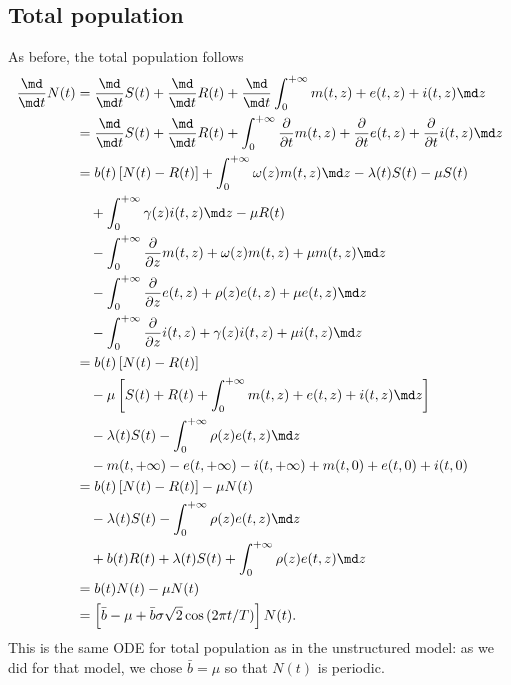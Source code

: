 \documentclass{jpmarticle}
\begin{document}
\subsection{Total population}

As before, the total population follows
\begin{equation}
  \begin{split}
    \frac{\md}{\md t} N(t)
    &= \frac{\md}{\md t} S(t)
    + \frac{\md}{\md t} R(t)
    + \frac{\md}{\md t} \int_0^{+\infty} m(t, z) + e(t, z) + i(t, z) \md z
    \\
    &= \frac{\md}{\md t} S(t)
    + \frac{\md}{\md t} R(t)
    + \int_0^{+\infty} \frac{\partial}{\partial t} m(t, z)
    + \frac{\partial}{\partial t} e(t, z)
    + \frac{\partial}{\partial t} i(t, z) \md z
    \\
    &=
    b(t) \left[N(t) - R(t)\right]
    + \int_0^{+\infty} \omega(z) m(t, z) \md z
    - \lambda(t) S(t) - \mu S(t)
    \\ & \quad {}
    + \int_0^{+\infty} \gamma(z) i(t, z) \md z
    - \mu R(t)
    \\ & \quad {}
    - \int_0^{+\infty}
    \frac{\partial}{\partial z} m(t, z)
    + \omega(z) m(t, z)
    + \mu m(t, z)
    \md z
    \\ & \quad {}
    - \int_0^{+\infty}
    \frac{\partial}{\partial z} e(t, z)
    + \rho(z) e(t, z)
    + \mu e(t, z)
    \md z
    \\ & \quad {}
    - \int_0^{+\infty}
    \frac{\partial}{\partial z} i(t, z)
    + \gamma(z) i(t, z)
    + \mu i(t, z)
    \md z
    \\
    &=
    b(t) \left[N(t) - R(t)\right]
    \\ & \quad {}
    - \mu \left[
      S(t) + R(t)
      + \int_0^{+\infty}
      m(t, z) + e(t, z) + i(t, z)
      \md z
    \right]
    \\ & \quad {}
    - \lambda(t) S(t)
    - \int_0^{+\infty}
    \rho(z) e(t, z)
    \md z
    \\ & \quad {}
    - m(t, +\infty) - e(t, +\infty) - i(t, +\infty)
    + m(t, 0) + e(t, 0) + i(t, 0)
    \\
    &=
    b(t) \left[N(t) - R(t)\right]
    - \mu N(t)
    \\ & \quad {}
    - \lambda(t) S(t)
    - \int_0^{+\infty}
    \rho(z) e(t, z)
    \md z
    \\ & \quad {}
    + b(t) R(t)
    + \lambda(t) S(t)
    + \int_0^{+\infty} \rho(z) e(t, z) \md z
    \\
    &= b(t) N(t) - \mu N(t)
    \\
    &= \left[
      \bar{b} - \mu
      + \bar{b} \sigma \sqrt{2} \cos\left(2 \pi t / T\right)
    \right] N(t).
  \end{split}
\end{equation}
This is the same ODE for total population as in the unstructured
model: as we did for that model, we chose $\bar{b} = \mu$ so that
$N(t)$ is periodic.
\end{document}
